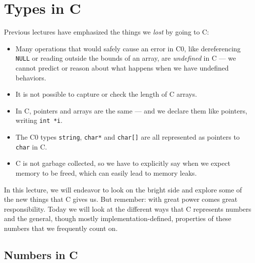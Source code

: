 \chapter{Types in C}
\label{ch:types}

\newcommand{\lecnum}{21}
\newcommand{\lecturer}{Frank Pfenning, Rob Simmons, Iliano Cervesato}

\maketitle

\begin{preamble}
\noindent
Previous lectures have emphasized the things we \emph{lost} by going to C:
\begin{itemize}
\item%
  Many operations that would safely cause an error in C0, like
  dereferencing \lstinline'NULL' or reading outside the bounds of an
  array, are \emph{undefined} in C --- we cannot predict or reason
  about what happens when we have undefined behaviors.
\item%
  It is not possible to capture or check the length of C arrays.
\item%
  In C, pointers and arrays are the same --- and we declare them like
  pointers, writing \lstinline'int *i'.
\item%
  The C0 types \lstinline'string', \lstinline'char*' and
  \lstinline'char[]' are all represented as pointers to
  \lstinline'char' in C.
\item%
  C is not garbage collected, so we have to explicitly say when we
  expect memory to be freed, which can easily lead to memory leaks.
\end{itemize}
In this lecture, we will endeavor to look on the bright side and
explore some of the new things that C gives us. But remember: with
great power comes great responsibility.  Today we will look at the
different ways that C represents numbers and the general, though
mostly implementation-defined, properties of these numbers that we
frequently count on.
\end{preamble}

\section{Numbers in C}
\label{sec:types:c_numbers}


